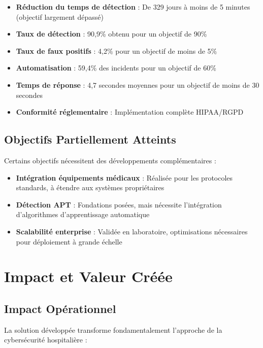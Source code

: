 \begin{itemize}
    \item \cmark \textbf{Réduction du temps de détection} : De 329 jours à moins de 5 minutes (objectif largement dépassé)
    \item \cmark \textbf{Taux de détection} : 90,9\% obtenu pour un objectif de 90\%
    \item \cmark \textbf{Taux de faux positifs} : 4,2\% pour un objectif de moins de 5\%
    \item \cmark \textbf{Automatisation} : 59,4\% des incidents pour un objectif de 60\%
    \item \cmark \textbf{Temps de réponse} : 4,7 secondes moyennes pour un objectif de moins de 30 secondes
    \item \cmark \textbf{Conformité réglementaire} : Implémentation complète HIPAA/RGPD
\end{itemize}

\subsection{Objectifs Partiellement Atteints}

Certains objectifs nécessitent des développements complémentaires :

\begin{itemize}
    \item \warning \textbf{Intégration équipements médicaux} : Réalisée pour les protocoles standards, à étendre aux systèmes propriétaires
    \item \warning \textbf{Détection APT} : Fondations posées, mais nécessite l'intégration d'algorithmes d'apprentissage automatique
    \item \warning \textbf{Scalabilité enterprise} : Validée en laboratoire, optimisations nécessaires pour déploiement à grande échelle
\end{itemize}

\section{Impact et Valeur Créée}

\subsection{Impact Opérationnel}

La solution développée transforme fondamentalement l'approche de la cybersécurité hospitalière :

